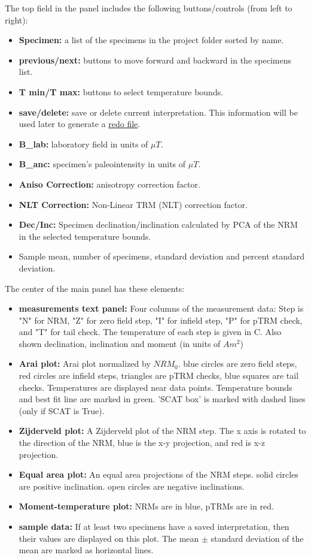 \documentclass[11pt]{book}
\begin{document}
{{\noindent
	The top field in the  panel includes the following buttons/controls (from left to right):
	\begin{itemize}
\item {\bf Specimen:} a list of the specimens in the project folder sorted by name.
\item {\bf previous/next:} buttons to move forward and backward in the specimens list.
\item {\bf T min/T max:} buttons to select temperature bounds.
\item {\bf save/delete:} save or delete current interpretation. This information will be used later to generate a \href{#mk_redo.py}{redo file}.
\item {\bf B\_lab:} laboratory field in units of $\mu T$.
\item {\bf B\_anc:} specimen's paleointensity in units of $\mu T$.
\item {\bf Aniso Correction:} anisotropy correction factor.
\item {\bf NLT Correction:} Non-Linear TRM (NLT) correction factor.
\item {\bf Dec/Inc:} Specimen declination/inclination calculated by PCA of the NRM in the selected temperature bounds.
\item Sample mean, number of specimens, standard deviation and percent standard deviation.
\end{itemize}

The center of the main panel has these elements:

\begin{itemize}
\item {\bf measurements text panel:} Four columns of the measurement data: Step is "N" for NRM, "Z" for zero field step, "I" for infield step, "P" for pTRM check, and "T" for tail check. The temperature of each step is given in C. Also shown  declination, inclination and moment (in units of $Am^2$) 
\item {\bf Arai plot:}  Arai plot normalized by $NRM_0$. blue circles are zero field steps, red circles are infield steps, triangles are pTRM checks, blue squares are tail checks. Temperatures are displayed near data points. Temperature bounds and best fit line are marked in green. 'SCAT box' is marked with dashed lines (only if SCAT is True). 
\item {\bf Zijderveld plot:}  A Zijderveld plot of the NRM step.  The x axis is rotated to the direction of the NRM, blue is the x-y  projection, and red is x-z projection.
\item {\bf Equal area plot:}  An equal area projections  of the NRM steps. solid circles are positive inclination. open circles are negative inclinations.  
\item {\bf Moment-temperature plot:}  NRMs are in blue, pTRMs are in red.
\item {\bf sample data:}  If at least two specimens have a saved interpretation, then their values are displayed on this plot. The mean $\pm$ standard deviation of the mean are marked as  horizontal lines. 
\end{itemize}

}}
\end{document}

